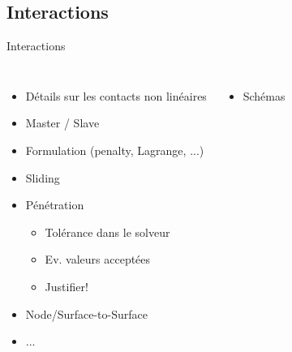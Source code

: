 \subsection{Interactions}
\label{sec:Interactions}

\begin{frame}[c]{Interactions}
  \begin{columns}
    \begin{itemize}
        \item Détails sur les contacts non linéaires
        \item Master / Slave
        \item Formulation (penalty, Lagrange, ...)
        \item Sliding
        \item Pénétration
        \begin{itemize}
            \item Tolérance dans le solveur
            \item Ev. valeurs acceptées
            \item Justifier!
        \end{itemize}
        \item Node/Surface-to-Surface
        \item ...
    \end{itemize}
    \begin{itemize}
        \item Schémas
    \end{itemize}
  \end{columns}
\end{frame}

		